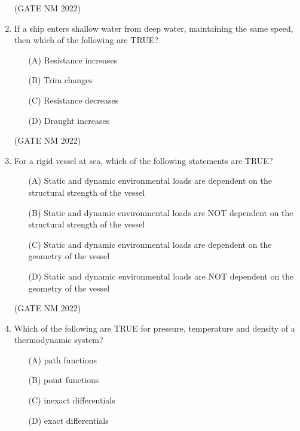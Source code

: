 \documentclass[journal,12pt,onecolumn]{IEEEtran}
\theoremstyle{remark}
\begin{document}
\begin{enumerate}
\hfill(GATE NM 2022)




\item  If a ship enters shallow water from deep water, maintaining the same speed, then which of the following are TRUE?

	\begin{multicols}{2}

\begin{enumerate}
    \item[(A)] Resistance increases
    \item[(B)] Trim changes
    \item[(C)] Resistance decreases
    \item[(D)] Draught increases
\end{enumerate}

	\end{multicols}

\hfill(GATE NM 2022)






\item  For a rigid vessel at sea, which of the following statements are TRUE?

\begin{enumerate}
    \item[(A)] Static and dynamic environmental loads are dependent on the structural strength of the vessel
    \item[(B)] Static and dynamic environmental loads are NOT dependent on the structural strength of the vessel
    \item[(C)] Static and dynamic environmental loads are dependent on the geometry of the vessel
    \item[(D)] Static and dynamic environmental loads are NOT dependent on the geometry of the vessel
\end{enumerate}

\hfill(GATE NM 2022)




\item  Which of the following are TRUE for pressure, temperature and density of a thermodynamic system?

	\begin{multicols}{2}

\begin{enumerate}
    \item[(A)] path functions
    \item[(B)] point functions
    \item[(C)] inexact differentials
    \item[(D)] exact differentials
\end{enumerate}


\end{multicols}
\end{enumerate}
\end{document}
